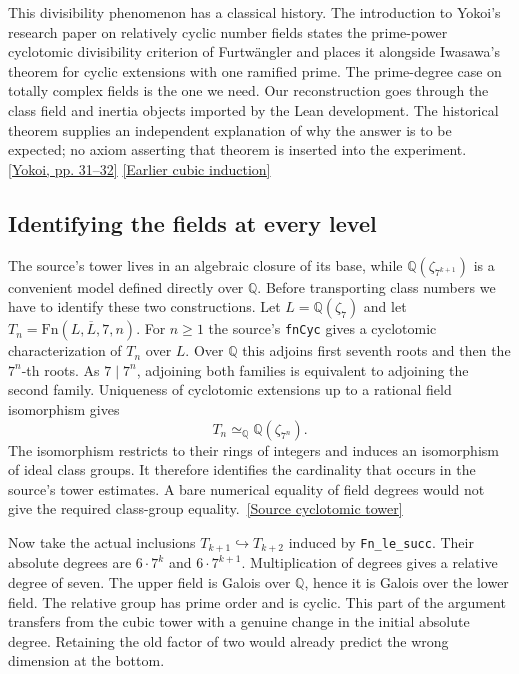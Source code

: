 \documentclass[12pt,letterpaper]{article}
\begin{document}
This divisibility phenomenon has a classical history. The introduction to Yokoi's research paper on relatively cyclic number fields states the prime-power cyclotomic divisibility criterion of Furtwängler and places it alongside Iwasawa's theorem for cyclic extensions with one ramified prime. The prime-degree case on totally complex fields is the one we need. Our reconstruction goes through the class field and inertia objects imported by the Lean development. The historical theorem supplies an independent explanation of why the answer is to be expected; no axiom asserting that theorem is inserted into the experiment.
\href{https://doi.org/10.1017/S0027763000024119}{[Yokoi, pp. 31--32]}\quad
\href{https://github.com/nousentllc/riemann-hypothesis/blob/e674cb750ef96b2f5e7cd46586ea4edb9998715a/research/uriel/experiments/ascent-witness/TowerResult.lean#L19-L69}{[Earlier cubic induction]}

\subsection{Identifying the fields at every level}

The source's tower lives in an algebraic closure of its base, while \(\mathbb Q(\zeta_{7^{k+1}})\) is a convenient model defined directly over \(\mathbb Q\). Before transporting class numbers we have to identify these two constructions. Let \(L=\mathbb Q(\zeta_7)\) and let \(T_n=\mathrm{Fn}(L,\overline L,7,n)\). For \(n\ge1\) the source's \texttt{fnCyc} gives a cyclotomic characterization of \(T_n\) over \(L\). Over \(\mathbb Q\) this adjoins first seventh roots and then the \(7^n\)-th roots. As \(7\mid 7^n\), adjoining both families is equivalent to adjoining the second family. Uniqueness of cyclotomic extensions up to a rational field isomorphism gives
\[
   T_n\simeq_{\mathbb Q}\mathbb Q(\zeta_{7^n}).
\]
The isomorphism restricts to their rings of integers and induces an isomorphism of ideal class groups. It therefore identifies the cardinality that occurs in the source's tower estimates. A bare numerical equality of field degrees would not give the required class-group equality.\
\href{https://github.com/nousentllc/riemann-hypothesis/blob/40e56bab026552e089d7afcfeff08d2defb9c005/src/Development/AutomorphicArithmetic/AutomorphicVarieties/GaloisLibrary/KummerTheory/FnCycMap.lean}{[Source cyclotomic tower]}

Now take the actual inclusions \(T_{k+1}\hookrightarrow T_{k+2}\) induced by \texttt{Fn\_le\_succ}. Their absolute degrees are \(6\cdot7^k\) and \(6\cdot7^{k+1}\). Multiplication of degrees gives a relative degree of seven. The upper field is Galois over \(\mathbb Q\), hence it is Galois over the lower field. The relative group has prime order and is cyclic. This part of the argument transfers from the cubic tower with a genuine change in the initial absolute degree. Retaining the old factor of two would already predict the wrong dimension at the bottom.
\end{document}
